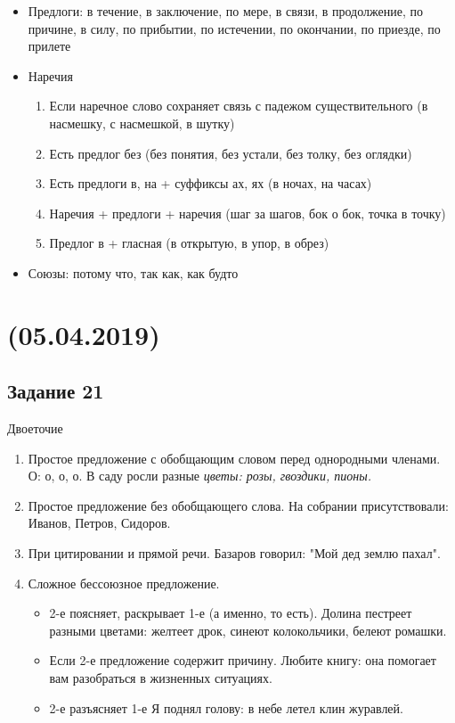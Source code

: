 \documentclass{article}
\begin{document}
\begin{itemize}
\item
  Предлоги: в течение, в заключение, по мере, в связи, в продолжение, по причине, в силу, по прибытии, по истечении,
  по окончании, по приезде, по прилете
\item
  Наречия
  \begin{enumerate}
  \item
    Если наречное слово сохраняет связь с падежом существительного (в насмешку, с насмешкой, в шутку)
  \item
    Есть предлог без (без понятия, без устали, без толку, без оглядки)
  \item
    Есть предлоги в, на + суффиксы ах, ях (в ночах, на часах)
  \item
    Наречия + предлоги + наречия (шаг за шагов, бок о бок, точка в точку)
  \item
    Предлог в + гласная (в открытую, в упор, в обрез)
  \end{enumerate}
\item
  Союзы: потому что, так как, как будто
\end{itemize}

\newpage
\noindent\makebox[\linewidth]{\rule{\paperwidth}{0.4pt}}
\section{(05.04.2019)}
\noindent\makebox[\linewidth]{\rule{\paperwidth}{0.4pt}}

\subsection{Задание 21}

Двоеточие

\begin{enumerate}
\item
  Простое предложение с обобщающим словом перед однородными членами. О: о, о, о.
  В саду росли разные \it{цветы}: розы, гвоздики, пионы.
\item
  Простое предложение без обобщающего слова. На собрании присутствовали: Иванов, Петров, Сидоров.
\item
  При цитировании и прямой речи. Базаров говорил: "Мой дед землю пахал".
\item
  Сложное бессоюзное предложение.
  \begin{itemize}
  \item
    2-е поясняет, раскрывает 1-е (а именно, то есть).
    Долина пестреет разными цветами: желтеет дрок, синеют колокольчики, белеют ромашки.
  \item
    Если 2-е предложение содержит причину.
    Любите книгу: она помогает вам разобраться в жизненных ситуациях.
  \item
    2-е разъясняет 1-е
    Я поднял голову: в небе летел клин журавлей.
  \end{itemize}
\end{enumerate}
\end{document}
